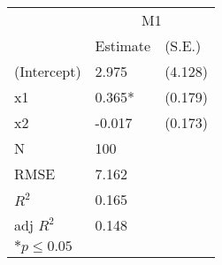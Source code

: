 \begin{tabular}{*{3}{l}}
 \hline
                &\multicolumn{2}{c}{M1}   \\
                &Estimate &(S.E.) \\
 \hline
 \hline
  (Intercept)    &  2.975  &   (4.128) \\
  x1             &  0.365*  &   (0.179) \\
  x2             & -0.017  &   (0.173) \\
 \hline 
 N                &100      &       \\
 RMSE            &7.162        & \\
 $R^2$           &0.165        & \\
 adj $R^2$       &0.148        & \\
 \hline
 \hline
 
 \multicolumn{2}{l}{${*}  p \le 0.05$   }\\
 \end{tabular}